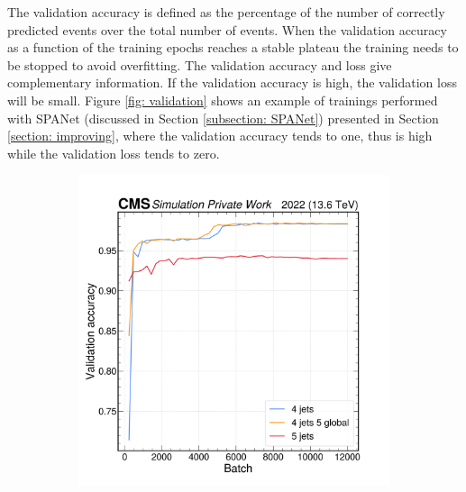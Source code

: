

The validation accuracy is defined as the percentage of the number of correctly predicted events over the total number of events. When the validation accuracy as a function of the training epochs reaches a stable plateau the training needs to be stopped to avoid overfitting. The validation accuracy and loss give complementary information. If the validation accuracy is high, the validation loss will be small. Figure \ref{fig: validation} shows an example of trainings performed with SPANet (discussed in Section \ref{subsection: SPANet}) presented in Section \ref{section: improving}, where the validation accuracy tends to one, thus is high while the validation loss tends to zero.

\begin{figure}[h!]
    \centering
    \begin{subfigure}[b]{0.45\textwidth}
        \centering
        \includegraphics[width=\textwidth]{Images/5.SPANet/comp_4_4j5_5.png}
    \end{subfigure}
    \hfill
    \begin{subfigure}[b]{0.45\textwidth}
        \centering

\end{subfigure}
\end{figure}
